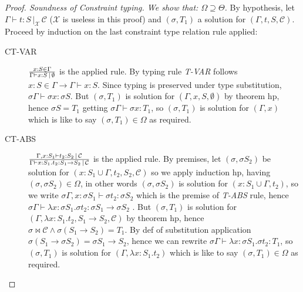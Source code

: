 \documentclass[8pt]{beamer}
\begin{document}
\begin{frame}
    \footnotesize
    \begin{proof}[Proof. Soundness of Constraint typing. We show that: 
        $\Omega \supseteq \Theta$]
        By hypothesis, let $\Gamma \vdash t : S \, |_{\mathcal{X}} \,
        \mathcal{C}$ ($\mathcal{X}$ is useless in this proof) and 
        $(\sigma, T_1)$ a solution for $(\Gamma, t, S, \mathcal{C})$.  
        Proceed by induction on the last constraint type relation rule 
        applied:
        \begin{description}
            \item[CT-VAR] ${{x:S\in\Gamma}\over{\Gamma \vdash x:S
                \,|\,\emptyset}}$ is the applied
                rule.  By typing rule \emph{T-VAR} follows $x:S\in 
                \Gamma \rightarrow \Gamma \vdash x:S$. Since typing is 
                preserved under type substitution, $\sigma\Gamma 
                \vdash \sigma x:\sigma S$.  But $(\sigma, T_1)$ is 
                solution for $(\Gamma, x, S, \emptyset)$ by theorem 
                hp, hence $\sigma S = T_1$ getting $\sigma \Gamma 
                \vdash \sigma x:T_1$, so $(\sigma, T_1)$ is solution 
                for $(\Gamma, x)$  which is like to say $(\sigma, 
                T_1)\in\Omega$ as required.
            \item[CT-ABS] ${{\Gamma, x:S_1\vdash t_2: S_2 
                \,|\,\mathcal{C}}\over{\Gamma \vdash x:S_1.t_2:S_1 
                \rightarrow S_2 \,|\,\mathcal{C}}}$ is the applied 
                rule.  By premises, let $(\sigma, \sigma S_2)$ be 
                solution for $(x:S_1 \cup \Gamma, t_2, S_2, 
                \mathcal{C})$ so we apply induction hp, having 
                $(\sigma, \sigma S_2) \in \Omega$, in other
                words $(\sigma, \sigma S_2)$ is solution for $(x:S_1 
                \cup \Gamma, t_2)$, so we write $\sigma\Gamma,x:\sigma 
                S_1 \vdash \sigma t_2 : \sigma S_2$ which is the 
                premise of \emph{T-ABS} rule, hence $\sigma \Gamma 
                \vdash \lambda x:\sigma S_1.\sigma t_2: \sigma S_1 
                \rightarrow \sigma S_2$
                . But $(\sigma, T_1)$ is solution for
                $(\Gamma, \lambda x:S_1.t_2, S_1\rightarrow S_2, 
                \mathcal{C})$ by theorem hp, hence $\sigma \Join 
                \mathcal{C} \wedge \sigma (S_1 \rightarrow S_2) = 
                T_1$. By def of substitution application $\sigma (S_1 
                \rightarrow \sigma S_2) = \sigma S_1 \rightarrow S_2$, 
                hence
                we can rewrite $\sigma \Gamma \vdash \lambda x:\sigma 
                S_1.\sigma t_2:T_1$, so $(\sigma, T_1)$ is solution 
                for $(\Gamma, \lambda x:S_1.t_2)$  which is like to 
                say $(\sigma, T_1) \in \Omega$ as required.  


\end{description}
\end{proof}
\end{frame}
\end{document}
